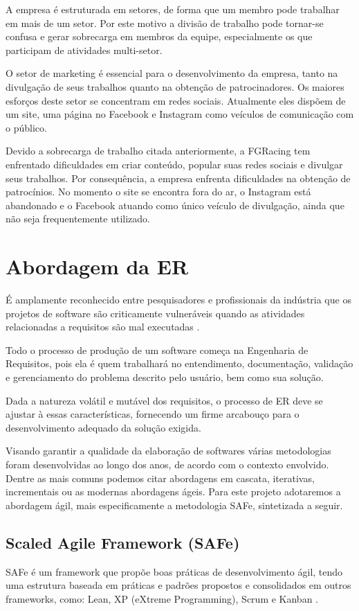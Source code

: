 A empresa é estruturada em setores, de forma que um membro pode trabalhar em mais de um setor.
Por este motivo a divisão de trabalho pode tornar-se confusa e gerar sobrecarga em membros da equipe,
especialmente os que participam de atividades multi-setor.

O setor de marketing é essencial para o desenvolvimento da empresa, tanto na divulgação de seus
trabalhos quanto na obtenção de patrocinadores. Os maiores esforços deste setor se concentram em redes sociais.
Atualmente eles dispõem de um site, uma página no Facebook e Instagram como veículos de comunicação com o público.

Devido a sobrecarga de trabalho citada anteriormente, a FGRacing tem enfrentado dificuldades em criar conteúdo,
popular suas redes sociais e divulgar seus trabalhos. Por consequência, a empresa enfrenta dificuldades na obtenção
de patrocínios. No momento o site se encontra fora do ar, o Instagram está abandonado e o Facebook atuando como único
veículo de divulgação, ainda que não seja frequentemente utilizado.

\chapter[Abordagem da ER]{Abordagem da ER}

É amplamente reconhecido entre pesquisadores e profissionais da indústria que os projetos de software são criticamente
vulneráveis quando as atividades relacionadas a requisitos são mal executadas \cite{swebok2004}.

Todo o processo de produção de um software começa na Engenharia de Requisitos, pois ela é quem trabalhará no entendimento,
documentação, validação e gerenciamento do problema descrito pelo usuário, bem como sua solução.

Dada a natureza volátil e mutável dos requisitos, o processo de ER deve se ajustar à essas características, fornecendo um
firme arcabouço para o desenvolvimento adequado da solução exigida.

Visando garantir a qualidade da elaboração de softwares várias metodologias foram desenvolvidas ao longo dos anos, de acordo
com o contexto envolvido. Dentre as mais comuns podemos citar abordagens em cascata, iterativas, incrementais ou as modernas
abordagens ágeis. Para este projeto adotaremos a abordagem ágil, mais especificamente a metodologia SAFe, sintetizada a seguir.

\section{Scaled Agile Framework (SAFe)}
 SAFe é um framework que propõe boas práticas de desenvolvimento ágil, tendo uma estrutura baseada em práticas e padrões
 propostos e consolidados em outros frameworks, como: Lean, XP (eXtreme Programming), Scrum e Kanban \cite{dasilva2016}.

